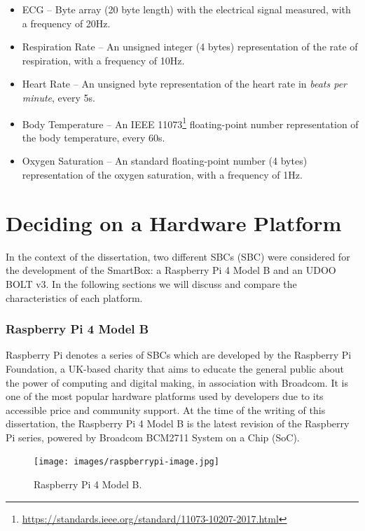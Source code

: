 \begin{itemize}
    \item \acf{ECG} -- Byte array (20 byte length) with the electrical signal measured, with a frequency of 20Hz.
    \item Respiration Rate -- An unsigned integer (4 bytes) representation of the rate of respiration, with a frequency of 10Hz.
    \item Heart Rate -- An unsigned byte representation of the heart rate in \textit{beats per minute}, every 5s.
    \item Body Temperature -- An IEEE 11073\footnote{\url{https://standards.ieee.org/standard/11073-10207-2017.html}} floating-point number representation of the body temperature, every 60s.
    \item Oxygen Saturation -- An standard floating-point number (4 bytes) representation of the oxygen saturation, with a frequency of 1Hz.
\end{itemize}


\section{Deciding on a Hardware Platform}

In the context of the dissertation, two different \acl{SBC}s (\acs{SBC}) were considered for the development of the SmartBox: a Raspberry Pi 4 Model B and an UDOO BOLT v3. In the following sections we will discuss and compare the characteristics of each platform. 

\subsubsection{Raspberry Pi 4 Model B}

Raspberry Pi denotes a series of \acs{SBC}s which are developed by the Raspberry Pi Foundation, a UK-based charity that aims to educate the general public about the power of computing and digital making, in association with Broadcom. It is one of the most popular hardware platforms used by developers due to its accessible price and community support.
At the time of the writing of this dissertation, the Raspberry Pi 4 Model B is the latest revision of the Raspberry Pi series, powered by Broadcom BCM2711 System on a Chip (SoC).

\begin{figure}[H]
    \centering
    \texttt{[image: images/raspberrypi-image.jpg]}
    \caption{Raspberry Pi 4 Model B.}
    \label{fig:raspberrypi-image}
\end{figure}

